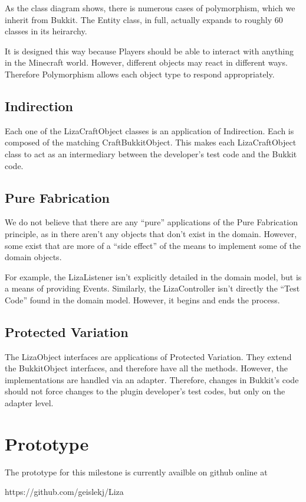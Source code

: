 \documentclass{article}
\begin{document}
	As the class diagram shows, there is numerous cases of polymorphism, 
	which we inherit from Bukkit. The Entity class, in full, actually expands
	to roughly 60 classes in its heirarchy. 

	It is designed this way because Players should be able to interact
	with anything in the Minecraft world. However, different objects 
	may react in different ways. Therefore Polymorphism allows each
	object type to respond appropriately. 

	\subsection{Indirection}

	Each one of the LizaCraftObject classes is an application of
	Indirection. Each is composed of the matching CraftBukkitObject.
	This makes each LizaCraftObject class to act as an intermediary
	between the developer's test code and the Bukkit code.

	\subsection{Pure Fabrication}

	We do not believe that there are any ``pure'' applications of the
	Pure Fabrication principle, as in there aren't any objects that don't
	exist in the domain. However, some exist that are more of a ``side
	 effect'' of the means to implement some of the domain objects. 

	For example, the LizaListener isn't explicitly detailed in the domain
	model, but is a means of providing Events. Similarly, the LizaController
	isn't directly the ``Test Code'' found in the domain model. However,
	it begins and ends the process.

	\subsection{Protected Variation}

	The LizaObject interfaces are applications of Protected Variation.
	They extend the BukkitObject interfaces, and therefore have
	all the methods. However, the implementations are handled
	via an adapter. Therefore, changes in Bukkit's code should not
	force changes to the plugin developer's test codes, but only
	on the adapter level.

\newpage
\section{Prototype}

The prototype for this milestone is currently availble on github online at

\noindent
https://github.com/geislekj/Liza
\end{document}
